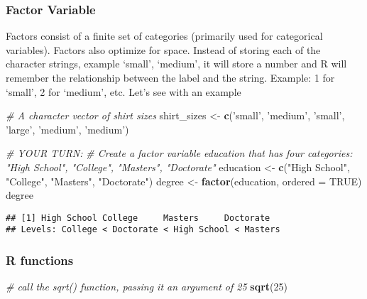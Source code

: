 \documentclass[
]{article}
\newenvironment{Shaded}{\begin{snugshade}}{\end{snugshade}}
\newcommand{\CommentTok}[1]{\textcolor[rgb]{0.56,0.35,0.01}{\textit{#1}}}
\newcommand{\DataTypeTok}[1]{\textcolor[rgb]{0.13,0.29,0.53}{#1}}
\newcommand{\DecValTok}[1]{\textcolor[rgb]{0.00,0.00,0.81}{#1}}
\newcommand{\KeywordTok}[1]{\textcolor[rgb]{0.13,0.29,0.53}{\textbf{#1}}}
\newcommand{\NormalTok}[1]{#1}
\newcommand{\OtherTok}[1]{\textcolor[rgb]{0.56,0.35,0.01}{#1}}
\newcommand{\StringTok}[1]{\textcolor[rgb]{0.31,0.60,0.02}{#1}}
\begin{document}
\hypertarget{factor-variable}{%
\subsubsection{Factor Variable}\label{factor-variable}}

Factors consist of a finite set of categories (primarily used for
categorical variables). Factors also optimize for space. Instead of
storing each of the character strings, example `small', `medium', it
will store a number and R will remember the relationship between the
label and the string. Example: 1 for `small', 2 for `medium', etc. Let's
see with an example

\begin{Shaded}
\begin{Highlighting}[]
\CommentTok{# A character vector of shirt sizes}
\NormalTok{shirt_sizes <-}\StringTok{ }\KeywordTok{c}\NormalTok{(}\StringTok{'small'}\NormalTok{, }\StringTok{'medium'}\NormalTok{, }\StringTok{'small'}\NormalTok{, }\StringTok{'large'}\NormalTok{, }\StringTok{'medium'}\NormalTok{, }\StringTok{'medium'}\NormalTok{)}


\CommentTok{# YOUR TURN: }
\CommentTok{# Create a factor variable education that has four categories: "High School", "College", "Masters", "Doctorate"}
\NormalTok{education <-}\StringTok{ }\KeywordTok{c}\NormalTok{(}\StringTok{"High School"}\NormalTok{, }\StringTok{"College"}\NormalTok{, }\StringTok{"Masters"}\NormalTok{, }\StringTok{"Doctorate"}\NormalTok{)}
\NormalTok{degree <-}\StringTok{ }\KeywordTok{factor}\NormalTok{(education, }\DataTypeTok{ordered =} \OtherTok{TRUE}\NormalTok{)}
\NormalTok{degree}
\end{Highlighting}
\end{Shaded}

\begin{verbatim}
## [1] High School College     Masters     Doctorate  
## Levels: College < Doctorate < High School < Masters
\end{verbatim}

\hypertarget{r-functions}{%
\subsubsection{R functions}\label{r-functions}}

\begin{Shaded}
\begin{Highlighting}[]
\CommentTok{# call the sqrt() function, passing it an argument of 25}
\KeywordTok{sqrt}\NormalTok{(}\DecValTok{25}\NormalTok{)}
\end{Highlighting}
\end{Shaded}
\end{document}

